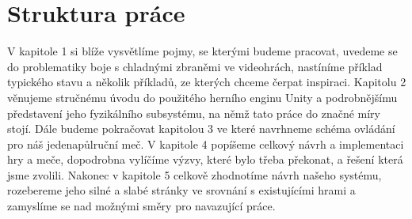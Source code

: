 \section*{Struktura práce}

V kapitole 1 si blíže vysvětlíme pojmy, se kterými budeme pracovat, uvedeme se do problematiky boje s chladnými zbraněmi ve videohrách, nastíníme příklad typického stavu a několik příkladů, ze kterých chceme čerpat inspiraci. Kapitolu 2 věnujeme stručnému úvodu do použitého herního enginu Unity a podrobnějšímu představení jeho fyzikálního subsystému, na němž tato práce do značné míry stojí. Dále budeme pokračovat kapitolou 3 ve které navrhneme schéma ovládání pro náš jedenapůlruční meč. V kapitole 4 popíšeme celkový návrh a implementaci hry a meče, dopodrobna vylíčíme výzvy, které bylo třeba překonat, a řešení která jsme zvolili. Nakonec v kapitole 5 celkově zhodnotíme návrh našeho systému, rozebereme jeho silné a slabé stránky ve srovnání s existujícími hrami a zamyslíme se nad možnými směry pro navazující práce.